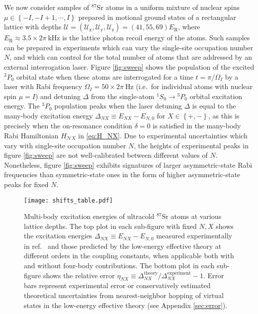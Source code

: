 \documentclass[preprint,showkeys,nofootinbib]{revtex4-1}
\renewcommand{\t}{\text} %
\newcommand{\p}[1]{\left(#1\right)} %
\renewcommand{\set}[1]{\left\{#1\right\}} %
\newcommand{\x}{\text{x}}
\newcommand{\y}{\text{y}}
\newcommand{\z}{\text{z}}
\newcommand{\N}{\mathcal{N}}
\newcommand{\U}{\mathcal{U}}
\newcommand{\1}{\mathds{1}}
\begin{document}
We now consider samples of ${}^{87}$Sr atoms in a uniform mixture of
nuclear spins $\mu\in\set{-I,-I+1,\cdots,I}$ prepared in motional
ground states of a rectangular lattice with depths
$\U=\p{\U_\x,\U_\y,\U_\z}=\p{41,55,69} E_{\t{R}}$, where
$E_{\t{R}}\approx3.5\times2\pi~\t{kHz}$ is the lattice photon recoil
energy of the atoms.  Such samples can be prepared in experiments
which can vary the single-site occupation number $N$, and which can
control for the total number of atoms that are addressed by an
external interrogation laser.  Figure \ref{fig:sweep} shows the
population of the excited ${}^3P_0$ orbital state when these atoms are
interrogated for a time $t=\pi/\Omega_I$ by a laser with Rabi
frequency $\Omega_I=50\times2\pi~\t{Hz}$ (i.e.~for individual atoms
with nuclear spin $\mu=I$) and detuning $\Delta$ from the single-atom
${}^1S_0\to{}^3P_0$ orbital excitation energy.  The ${}^3P_0$
population peaks when the laser detuning $\Delta$ is equal to the
many-body excitation energy $\Delta_{NX}\equiv E_{NX}-E_{N,0}$ for
$X\in\set{+,-}$, as this is precisely when the on-resonance condition
$\delta=0$ is satisfied in the many-body Rabi Hamiltonian $H_{\N X}$
in \eqref{eq:H_NX}.  Due to experimental uncertainties which vary with
single-site occupation number $N$, the heights of experimental peaks
in figure \ref{fig:sweep} are not well-calibrated between different
values of $N$.  Nonetheless, figure \ref{fig:sweep} exhibits
signatures of larger asymmetric-state Rabi frequencies than
symmetric-state ones in the form of higher asymmetric-state peaks for
fixed $N$.

\begin{figure}
  \centering
  \texttt{[image: shifts\_table.pdf]}
  \caption{\footnotesize Multi-body excitation energies of ultracold
    ${}^{87}$Sr atoms at various lattice depths.  The top plot in each
    sub-figure with fixed $N,X$ shows the excitation energies
    $\Delta_{NX}\equiv E_{NX}-E_{N,0}$ measured experimentally in
    ref.~\cite{goban2018emergence} and those predicted by the
    low-energy effective theory at different orders in the coupling
    constants, when applicable both with and without four-body
    contributions.  The bottom plot in each sub-figure shows the
    relative error
    $\eta_{NX}\equiv
    \Delta_{NX}^{\t{theory}}/\Delta_{NX}^{\t{experiment}}-1$.  Error
    bars represent experimental error or conservatively estimated
    theoretical uncertainties from nearest-neighbor hopping of virtual
    states in the low-energy effective theory (see Appendix
    \ref{sec:error}).}
  \label{fig:shifts}
\end{figure}
\end{document}
